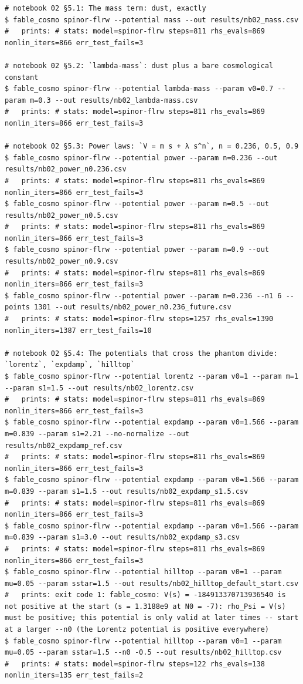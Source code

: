 \begin{Verbatim}
# notebook 02 §5.1: The mass term: dust, exactly
$ fable_cosmo spinor-flrw --potential mass --out results/nb02_mass.csv
#   prints: # stats: model=spinor-flrw steps=811 rhs_evals=869 nonlin_iters=866 err_test_fails=3

# notebook 02 §5.2: `lambda-mass`: dust plus a bare cosmological constant
$ fable_cosmo spinor-flrw --potential lambda-mass --param v0=0.7 --param m=0.3 --out results/nb02_lambda-mass.csv
#   prints: # stats: model=spinor-flrw steps=811 rhs_evals=869 nonlin_iters=866 err_test_fails=3

# notebook 02 §5.3: Power laws: `V = m s + λ s^n`, n = 0.236, 0.5, 0.9
$ fable_cosmo spinor-flrw --potential power --param n=0.236 --out results/nb02_power_n0.236.csv
#   prints: # stats: model=spinor-flrw steps=811 rhs_evals=869 nonlin_iters=866 err_test_fails=3
$ fable_cosmo spinor-flrw --potential power --param n=0.5 --out results/nb02_power_n0.5.csv
#   prints: # stats: model=spinor-flrw steps=811 rhs_evals=869 nonlin_iters=866 err_test_fails=3
$ fable_cosmo spinor-flrw --potential power --param n=0.9 --out results/nb02_power_n0.9.csv
#   prints: # stats: model=spinor-flrw steps=811 rhs_evals=869 nonlin_iters=866 err_test_fails=3
$ fable_cosmo spinor-flrw --potential power --param n=0.236 --n1 6 --points 1301 --out results/nb02_power_n0.236_future.csv
#   prints: # stats: model=spinor-flrw steps=1257 rhs_evals=1390 nonlin_iters=1387 err_test_fails=10

# notebook 02 §5.4: The potentials that cross the phantom divide: `lorentz`, `expdamp`, `hilltop`
$ fable_cosmo spinor-flrw --potential lorentz --param v0=1 --param m=1 --param s1=1.5 --out results/nb02_lorentz.csv
#   prints: # stats: model=spinor-flrw steps=811 rhs_evals=869 nonlin_iters=866 err_test_fails=3
$ fable_cosmo spinor-flrw --potential expdamp --param v0=1.566 --param m=0.839 --param s1=2.21 --no-normalize --out results/nb02_expdamp_ref.csv
#   prints: # stats: model=spinor-flrw steps=811 rhs_evals=869 nonlin_iters=866 err_test_fails=3
$ fable_cosmo spinor-flrw --potential expdamp --param v0=1.566 --param m=0.839 --param s1=1.5 --out results/nb02_expdamp_s1.5.csv
#   prints: # stats: model=spinor-flrw steps=811 rhs_evals=869 nonlin_iters=866 err_test_fails=3
$ fable_cosmo spinor-flrw --potential expdamp --param v0=1.566 --param m=0.839 --param s1=3.0 --out results/nb02_expdamp_s3.csv
#   prints: # stats: model=spinor-flrw steps=811 rhs_evals=869 nonlin_iters=866 err_test_fails=3
$ fable_cosmo spinor-flrw --potential hilltop --param v0=1 --param mu=0.05 --param sstar=1.5 --out results/nb02_hilltop_default_start.csv
#   prints: exit code 1: fable_cosmo: V(s) = -184913370713936540 is not positive at the start (s = 1.3188e9 at N0 = -7): rho_Psi = V(s) must be positive; this potential is only valid at later times -- start at a larger --n0 (the Lorentz potential is positive everywhere)
$ fable_cosmo spinor-flrw --potential hilltop --param v0=1 --param mu=0.05 --param sstar=1.5 --n0 -0.5 --out results/nb02_hilltop.csv
#   prints: # stats: model=spinor-flrw steps=122 rhs_evals=138 nonlin_iters=135 err_test_fails=2


\end{Verbatim}
